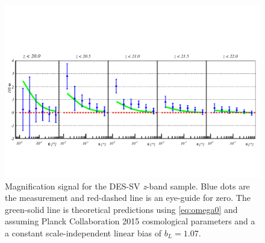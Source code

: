 \begin{figure}
\includegraphics[width=\textwidth,trim={0 2.3cm 0 3.5cm},clip]{./figures/mag_z.pdf}
\caption{Magnification signal for the DES-SV {\it z}-band sample.	 Blue dots are the measurement and red-dashed line is an eye-guide for zero. The green-solid line is theoretical predictions using \autoref{eq:omega0} and assuming Planck Collaboration 2015 cosmological parameters and a a constant scale-independent linear bias of $b_L=1.07$.}
\label{fig:resultsSV_z}
\end{figure}
\newline

